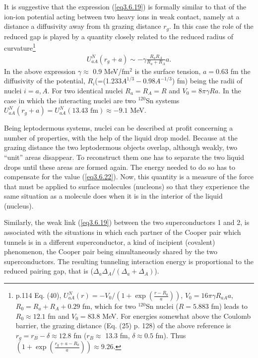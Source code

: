  
 It is suggestive that the expression (\ref{eq3.6.19}) is formally similar to that of the ion-ion potential acting between two heavy ions in weak contact, namely at a distance  a diffusivity away from th grazing distance $r_g$. In this case the role of the reduced gap is played by a quantity closely related to the reduced radius of curvature\footnote{\cite{Broglia:04a} p.114  Eq. (40), $U_{aA}^{N}(r)=-V_0/(1+\exp(\frac{r-R_0}{a}))$, $V_0=16\pi\gamma R_{aA}a$, $R_0=R_a+R_A+0.29$ fm, which for two $^{120}$Sn nuclei ($R=5.883$ fm) leads to $R_0\approx12.1$ fm and $V_0=83.8$ MeV. For energies somewhat above the Coulomb barrier, the grazing distance (Eq. (25) p. 128) of the above reference is $r_g=r_B-\delta\approx12.8$ fm ($r_B\approx$ 13.3 fm, $\delta\approx0.5$ fm). Thus $(1+\exp(\frac{r_g+a-R_0}{a}))\approx9.26$.}
 \begin{align}\label{eq3.6.22}
 U_{aA}^N(r_g+a)\sim -\gamma\frac{R_aR_A}{R_a+R_A}a.
 \end{align}
 In the above expression $\gamma\approx$ 0.9 MeV/fm$^2$ is the surface tension, $a=0.63$ fm the diffusivity of the potential, $R_i$(=(1.233$A^{1/3}-0.98A^{-1/3}$) fm) being the radii of nuclei $i=a,A$. For two identical nuclei $R_a=R_A=R$ and $V_0=8\pi\gamma R a$. In the case in which the interacting nuclei are two  $^{120}$Sn systems  $U_{aA}^N(r_g+a)=U_{aA}^N(13.43 \text{ fm})\approx-9.1$ MeV.
 
 
 
Being leptodermous systems, nuclei can be described at profit concerning a number of properties, with the help of the liquid drop model. Because at the grazing distance the two leptodermous objects overlap, although weakly, two ``unit'' areas disappear. To reconstruct them one has to separate the two liquid drops until these areas are formed again. The energy needed to do so has to compensate for the value (\ref{eq3.6.22}).  Now, this quantity is a measure of the force that must be applied to surface molecules (nucleons) so that they experience the same situation as a molecule does when it is in the interior of the liquid (nucleus). 
  
   
 Similarly, the weak link (\ref{eq3.6.19}) between the two superconductors 1 and 2, is associated with the situations in which each partner of the Cooper pair which tunnels is in a different superconductor, a kind of incipient (covalent) phenomenon, the Cooper pair being simultaneously shared by the two superconductors. The resulting tunneling interaction energy is proportional to the reduced pairing gap, that is ($\Delta_a\Delta_A/(\Delta_a+\Delta_A)$). 

